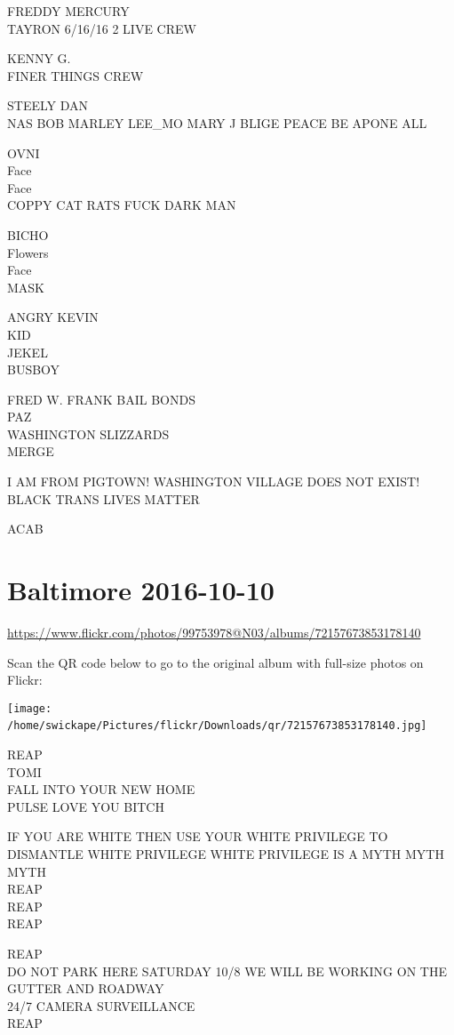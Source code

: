 \documentclass[10pt,letterpaper]{article}
\begin{document}
FREDDY MERCURY\\
TAYRON 6/16/16 2 LIVE CREW

KENNY G.\\
FINER THINGS CREW

STEELY DAN\\
NAS BOB MARLEY LEE\_MO MARY J BLIGE PEACE BE APONE ALL

OVNI\\
Face\\
Face\\
COPPY CAT RATS FUCK DARK MAN

BICHO\\
Flowers\\
Face\\
MASK

ANGRY KEVIN\\
KID\\
JEKEL\\
BUSBOY

FRED W. FRANK BAIL BONDS\\
PAZ\\
WASHINGTON SLIZZARDS\\
MERGE

I AM FROM PIGTOWN!  WASHINGTON VILLAGE DOES NOT EXIST!\\
BLACK TRANS LIVES MATTER

ACAB
\

\section*{Baltimore 2016-10-10}

\url{https://www.flickr.com/photos/99753978@N03/albums/72157673853178140}

Scan the QR code below to go to the original album with full-size photos on Flickr:

\texttt{[image: /home/swickape/Pictures/flickr/Downloads/qr/72157673853178140.jpg]}
\

REAP\\
TOMI\\
FALL INTO YOUR NEW HOME\\
PULSE LOVE YOU BITCH

IF YOU ARE WHITE THEN USE YOUR WHITE PRIVILEGE TO DISMANTLE WHITE PRIVILEGE WHITE PRIVILEGE IS A MYTH MYTH MYTH\\
REAP\\
REAP\\
REAP

REAP\\
DO NOT PARK HERE SATURDAY 10/8 WE WILL BE WORKING ON THE GUTTER AND ROADWAY\\
24/7 CAMERA SURVEILLANCE\\
REAP
\end{document}
